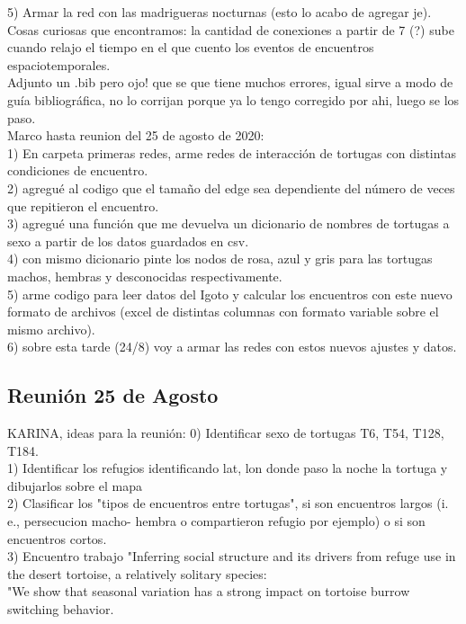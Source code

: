 \documentclass[12pt,screen,twoside,pagebackref]{ibtesis}
\begin{document}
5) Armar la red con las madrigueras nocturnas (esto lo acabo de agregar je).\\

Cosas curiosas que encontramos: la cantidad de conexiones a partir de 7 (?) sube cuando relajo el tiempo en el que cuento los eventos de encuentros espaciotemporales.\\
Adjunto un .bib pero ojo! que se que tiene muchos errores, igual sirve a modo de guía bibliográfica, no lo corrijan porque ya lo tengo corregido por ahi, luego se los paso.\\

Marco hasta reunion del 25 de agosto de 2020: \\
1) En carpeta primeras redes, arme redes de interacción de tortugas con distintas condiciones de encuentro.\\
2) agregué al codigo que el tamaño del edge sea dependiente del número de veces que  repitieron el encuentro.\\
3) agregué una función que me devuelva un dicionario de nombres de tortugas a sexo a partir de los datos guardados en csv.\\ 
4) con mismo dicionario pinte los nodos de rosa, azul y gris  para las tortugas machos, hembras y desconocidas respectivamente.\\ 
5) arme codigo para leer datos del Igoto y calcular los encuentros con este nuevo formato de archivos (excel de distintas columnas con formato variable sobre el mismo archivo).\\
6) sobre esta tarde (24/8) voy a armar las redes con estos nuevos ajustes y datos. 

\subsection*{Reunión 25 de Agosto}

KARINA, ideas para la reunión: 
0) Identificar sexo de tortugas T6, T54, T128, T184.\\
1) Identificar los refugios identificando lat, lon donde paso la noche la tortuga y dibujarlos sobre el mapa\\
2) Clasificar los "tipos de encuentros entre tortugas", si son encuentros largos (i. e., persecucion macho-
hembra o compartieron refugio por ejemplo) o si son encuentros cortos.\\ 
3) Encuentro trabajo "Inferring social structure and its drivers from refuge
use in the desert tortoise, a relatively solitary species:\\
"We show that seasonal variation has a strong impact on
tortoise burrow switching behavior.\\
\end{document}
